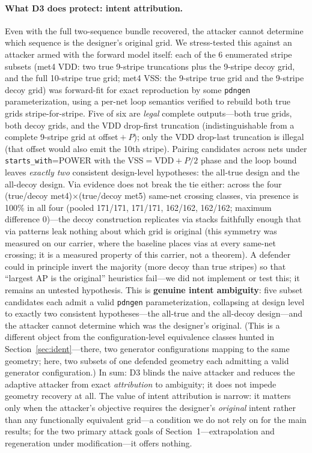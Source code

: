 \documentclass[11pt]{article}
\begin{document}
\paragraph{What D3 does protect: intent attribution.} Even with the full
two-sequence bundle recovered, the attacker cannot determine which
sequence is the designer's original grid.  We stress-tested this against
an attacker armed with the forward model itself: each of the 6
enumerated stripe subsets (met4 VDD: two true 9-stripe truncations plus
the 9-stripe decoy grid, and the full 10-stripe true grid; met4 VSS: the
9-stripe true grid and the 9-stripe decoy grid) was forward-fit for
exact reproduction by some \texttt{pdngen} parameterization, using a
per-net loop semantics verified to rebuild both true grids stripe-for-stripe.
Five of six are \emph{legal} complete outputs---both true grids, both
decoy grids, and the VDD drop-first truncation (indistinguishable from a
complete 9-stripe grid at offset${}+P$); only the VDD drop-last
truncation is illegal (that offset would also emit the 10th stripe).
Pairing candidates across nets under \texttt{starts\_with}=POWER with
the VSS${}={}$VDD${}+P/2$ phase and the loop bound leaves \emph{exactly
two} consistent design-level hypotheses: the all-true design and the
all-decoy design.  Via evidence does not break the tie either: across
the four (true/decoy met4)$\times$(true/decoy met5) same-net crossing
classes, via presence is 100\% in all four (pooled 171/171, 171/171,
162/162, 162/162; maximum difference 0)---the decoy construction
replicates via stacks faithfully enough that via patterns leak nothing
about which grid is original (this symmetry was measured on our
carrier, where the baseline places vias at every same-net crossing; it
is a measured property of this carrier, not a theorem).  A defender could in principle invert the
majority (more decoy than true stripes) so that ``largest AP is the
original'' heuristics fail---we did not implement or test this; it
remains an untested hypothesis.  This is \textbf{genuine
intent ambiguity}: five subset candidates each admit a valid
\texttt{pdngen} parameterization, collapsing at design level to exactly
two consistent hypotheses---the all-true and the all-decoy design---and
the attacker cannot determine which was the designer's original.
(This is a different object from the
configuration-level equivalence classes hunted in
Section~\ref{sec:ident}---there, two generator configurations mapping to
the same geometry; here, two subsets of one defended geometry each
admitting a valid generator configuration.)  In sum: D3
blinds the naive attacker and reduces the adaptive attacker from exact
\emph{attribution} to ambiguity; it does not impede geometry recovery at
all.  The value of intent attribution is narrow: it matters only when
the attacker's objective requires the designer's \emph{original} intent
rather than any functionally equivalent grid---a condition we do not
rely on for the main results; for the two primary attack goals of
Section~1---extrapolation and regeneration under
modification---it offers nothing.
\end{document}
